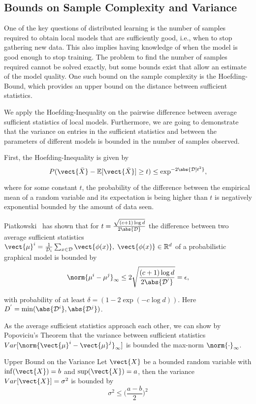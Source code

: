 \subsection{Bounds on Sample Complexity and Variance}
\label{ssec:bounds}
One of the key questions of distributed learning is the number of samples required to obtain local models that are sufficiently good, i.e., when to stop gathering new data.
This also implies having knowledge of when the model is good enough to stop training.
The problem to find the number of samples required cannot be solved exactly, but some bounds exist that allow an estimate of the model quality.
One such bound on the sample complexity is the Hoefding-Bound, which provides an upper bound on the distance between sufficient statistics.
 
We apply the Hoefding-Inequality on the pairwise difference between average sufficient statistics of local models.
Furthermore, we are going to demonstrate that the variance on entries in the sufficient statistics and between the parameters of different models is bounded in the number of samples observed.

First, the Hoefding-Inequality is given by
\begin{equation}
    P(\vect{\bar{X}} - \mathbb{E}[\vect{\bar{X}}] \geq t ) \leq \exp^{-2\abs{\mathcal{D}]t^2}},
\end{equation}

where for some constant $t$, the probability of the difference between the empirical mean of a random variable and its expectation is being higher than $t$ is negatively exponential bounded by the amount of data seen.

Piatkowski~\cite{piatkowski2019distributed} has shown that for $t = \frac{\sqrt{(c+1) \log d}}{2\abs{\mathcal{D}}}$ the difference between two average sufficient statistics $\vect{\mu}^i = \frac{1}{\mathcal{D}_i} \sum_{x \in \mathcal{D}} \vect{\phi(x)}, \; \vect{\phi(x)} \in \mathbb{R}^d$ of a probabilistic graphical model is bounded by
\begin{equation}
    \label{eq:hoefd}
    \norm{\mu^{i} -  \mu^{j}}_\infty \leq 2 \sqrt{
        \frac{(c+1) \log d}
        {2\abs{\mathcal{D^{'}}}}
        } = \epsilon,
\end{equation}

with probability of at least $\delta= (1- 2 \exp(-c \log d))$. Here $D^{'} = \min(\abs{\mathcal{D}^i}, \abs{\mathcal{D}^j})$.

As the average sufficient statistics approach each other, we can show by Popoviciu's Theorem \cite{popoviciu1935equations} that the variance between sufficient statistics $Var[\norm{\vect{\mu}^{i} -  \vect{\mu}^{j}}_\infty]$ is bounded \wrt the max-norm $\norm{\cdot}_{\infty}$.
\begin{threm}{Upper Bound on the Variance}
    Let $\vect{X}$ be a bounded random variable with $\inf(\vect{X}) = b$ and $\sup(\vect{X}) = a$, 
    then the variance $Var[\vect{X}] = \sigma^2$ is bounded by 
    \begin{equation}
        \sigma^2 \leq \bigg(\frac{a-b}{2}\bigg)^{2}
    \end{equation}
\end{threm}

